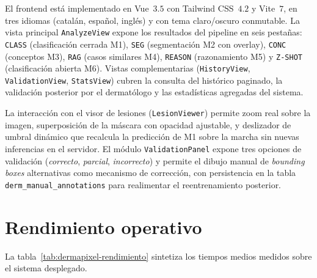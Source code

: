 El frontend está implementado en Vue~$3.5$ con Tailwind
CSS~$4.2$ y Vite~$7$, en tres idiomas (catalán, español,
inglés) y con tema claro/oscuro conmutable. La vista principal
\texttt{AnalyzeView} expone los resultados del pipeline en seis
pestañas: \texttt{CLASS} (clasificación cerrada M1),
\texttt{SEG} (segmentación M2 con overlay), \texttt{CONC}
(conceptos M3), \texttt{RAG} (casos similares M4),
\texttt{REASON} (razonamiento M5) y \texttt{Z-SHOT}
(clasificación abierta M6). Vistas complementarias
(\texttt{HistoryView}, \texttt{ValidationView},
\texttt{StatsView}) cubren la consulta del histórico paginado, la
validación posterior por el dermatólogo y las estadísticas
agregadas del sistema.

La interacción con el visor de lesiones
(\texttt{LesionViewer}) permite zoom real sobre la imagen,
superposición de la máscara con opacidad ajustable, y deslizador
de umbral dinámico que recalcula la predicción de M1 sobre la
marcha sin nuevas inferencias en el servidor. El módulo
\texttt{ValidationPanel} expone tres opciones de validación
(\emph{correcto}, \emph{parcial}, \emph{incorrecto}) y permite el
dibujo manual de \emph{bounding boxes} alternativas como mecanismo
de corrección, con persistencia en la tabla
\texttt{derm\_manual\_annotations} para realimentar el
reentrenamiento posterior.

\section{Rendimiento operativo}
\label{sec:dermapixel-rendimiento}

La tabla~\ref{tab:dermapixel-rendimiento} sintetiza los tiempos
medios medidos sobre el sistema desplegado.

